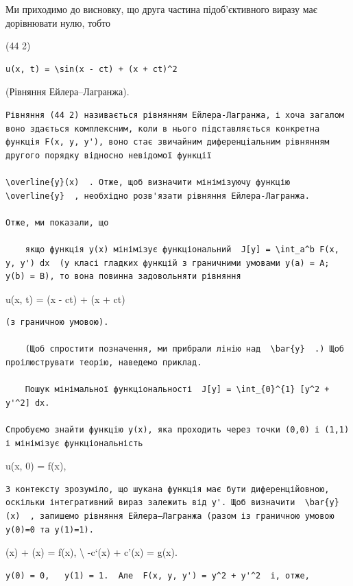 \documentclass[
  ukrainian,
]{article}
\begin{document}
Ми приходимо до висновку, що друга частина підоб'єктивного виразу має
дорівнювати нулю, тобто

(44 2)

\begin{verbatim}
u(x, t) = \sin(x - ct) + (x + ct)^2
\end{verbatim}

(Рівняння Ейлера--Лагранжа).

\begin{verbatim}
Рівняння (44 2) називається рівнянням Ейлера-Лагранжа, і хоча загалом воно здається комплексним, коли в нього підставляється конкретна функція F(x, y, y'), воно стає звичайним диференціальним рівнянням другого порядку відносно невідомої функції  

\overline{y}(x)  . Отже, щоб визначити мінімізуючу функцію  \overline{y}  , необхідно розв'язати рівняння Ейлера-Лагранжа.

Отже, ми показали, що

    якщо функція y(x) мінімізує функціональний  J[y] = \int_a^b F(x, y, y') dx  (у класі гладких функцій з граничними умовами y(a) = A; y(b) = B), то вона повинна задовольняти рівняння
\end{verbatim}

u(x, t) = \varphi(x - ct) + \psi(x + ct)

\begin{verbatim}
(з граничною умовою).

    (Щоб спростити позначення, ми прибрали лінію над  \bar{y}  .) Щоб проілюструвати теорію, наведемо приклад.

    Пошук мінімальної функціональності  J[y] = \int_{0}^{1} [y^2 + y'^2] dx.

Спробуємо знайти функцію y(x), яка проходить через точки (0,0) і (1,1) і мінімізує функціональність
\end{verbatim}

u(x, 0) = f(x),

\begin{verbatim}
З контексту зрозуміло, що шукана функція має бути диференційовною, оскільки інтегративний вираз залежить від y'. Щоб визначити  \bar{y}(x)  , запишемо рівняння Ейлера–Лагранжа (разом із граничною умовою y(0)=0 та y(1)=1).
\end{verbatim}

\varphi(x) + \psi(x) = f(x), \textbackslash{} -c\varphi`(x) + c\psi'(x)
= g(x).

\begin{verbatim}
y(0) = 0,   y(1) = 1.  Але  F(x, y, y') = y^2 + y'^2  і, отже,
\end{verbatim}
\end{document}
